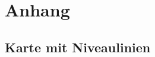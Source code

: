 





\cleardoubleoddemptypage
{}
\setcounter{page}{1}
\appendix
\chapter{Anhang} %
\label{cha:anhang}
\section{Karte mit Niveaulinien} %
\label{sec:karte_niveau}

\printindex
\listoffigures
\printbibliography
\todototoc
{}
